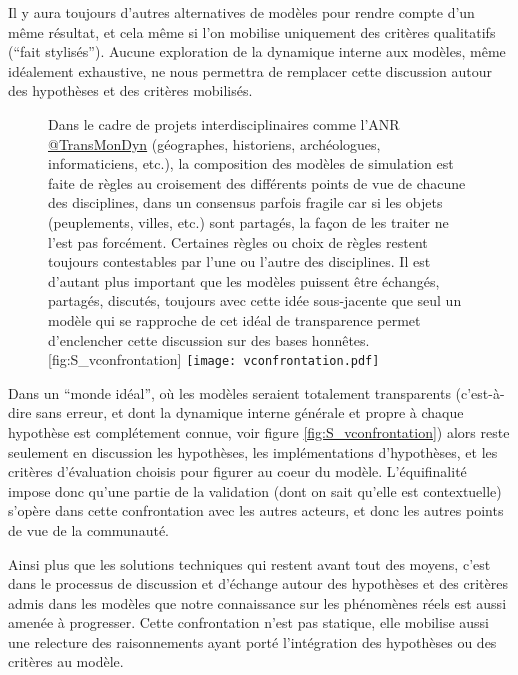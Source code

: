 Il y aura toujours d'autres alternatives de modèles pour rendre compte d'un même résultat, et cela même si l'on mobilise uniquement des critères qualitatifs (\enquote{fait stylisés}). Aucune exploration de la dynamique interne aux modèles, même idéalement exhaustive, ne nous permettra de remplacer cette discussion autour des hypothèses et des critères mobilisés.

\begin{figure}[htbp]
\begin{sidecaption}{Dans le cadre de projets interdisciplinaires comme l'ANR \href{http://www.transmondyn.parisgeo.cnrs.fr/}{@TransMonDyn} (géographes, historiens, archéologues, informaticiens, etc.), la composition des modèles de simulation est faite de règles au croisement des différents points de vue de chacune des disciplines, dans un consensus parfois fragile car si les objets (peuplements, villes, etc.) sont partagés, la façon de les traiter ne l'est pas forcément. Certaines règles ou choix de règles restent toujours contestables par l’une ou l’autre des disciplines. Il est d’autant plus important que les modèles puissent être échangés, partagés, discutés, toujours avec cette idée sous-jacente que seul un modèle qui se rapproche de cet idéal de transparence permet d’enclencher cette discussion sur des bases honnêtes.}[fig:S_vconfrontation]
  \centering
 \texttt{[image: vconfrontation.pdf]}
  \end{sidecaption}
\end{figure}

Dans un \enquote{monde idéal}, où les modèles seraient totalement transparents (c'est-à-dire sans erreur, et dont la dynamique interne générale et propre à chaque hypothèse est complétement connue, voir figure \ref{fig:S_vconfrontation}) alors reste seulement en discussion les hypothèses, les implémentations d'hypothèses, et les critères d’évaluation choisis pour figurer au coeur du modèle. L’équifinalité impose donc qu’une partie de la validation (dont on sait qu’elle est contextuelle) s'opère dans cette confrontation avec les autres acteurs, et donc les autres points de vue de la communauté.

Ainsi plus que les solutions techniques qui restent avant tout des moyens, c'est dans le processus de discussion et d'échange autour des hypothèses et des critères admis dans les modèles que notre connaissance sur les phénomènes réels est aussi amenée à progresser. Cette confrontation n'est pas statique, elle mobilise aussi une relecture des raisonnements ayant porté l'intégration des hypothèses ou des critères au modèle. %

